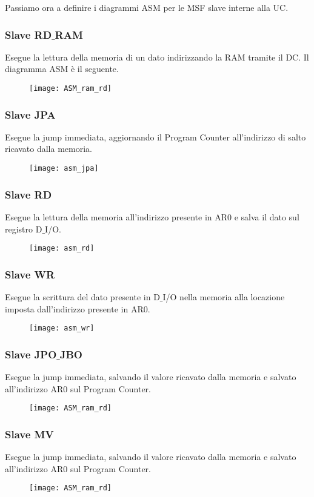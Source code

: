 Passiamo ora a definire i diagrammi ASM per le MSF slave interne alla UC.
\subsubsection{Slave RD$\_$RAM}
Esegue la lettura della memoria di un dato indirizzando la RAM tramite il DC. Il diagramma ASM è il seguente.
\begin{figure}[H]
	\centering
	\texttt{[image: ASM\_ram\_rd]}
	\label{fig:asm_ram_rd}
\end{figure}

\newpage
\subsubsection{Slave JPA}
Esegue la jump immediata, aggiornando il Program Counter all'indirizzo di salto ricavato dalla memoria.
\begin{figure}[H]
	\centering
	\texttt{[image: asm\_jpa]}
	\label{fig:asm_jpa}
\end{figure}

\newpage
\subsubsection{Slave RD}
Esegue la lettura della memoria all'indirizzo presente in AR0 e salva il dato sul registro D$\_$I/O.
\begin{figure}[H]
	\centering
	\texttt{[image: asm\_rd]}
	\label{fig:asm_rd}
\end{figure}

\newpage
\subsubsection{Slave WR}
Esegue la scrittura del dato presente in D$\_$I/O nella memoria alla locazione imposta dall'indirizzo presente in AR0.
\begin{figure}[H]
\centering
\texttt{[image: asm\_wr]}
\label{fig:asm_wr}
\end{figure}

\newpage
\subsubsection{Slave JPO$\_$JBO}
Esegue la jump immediata, salvando il valore ricavato dalla memoria e salvato all'indirizzo AR0 sul Program Counter.
\begin{figure}[H]
	\centering
	\texttt{[image: ASM\_ram\_rd]}
	\label{fig:asm_ram_rd}
\end{figure}

\newpage
\subsubsection{Slave MV}
Esegue la jump immediata, salvando il valore ricavato dalla memoria e salvato all'indirizzo AR0 sul Program Counter.
\begin{figure}[H]
	\centering
	\texttt{[image: ASM\_ram\_rd]}
	\label{fig:asm_ram_rd}
\end{figure}



